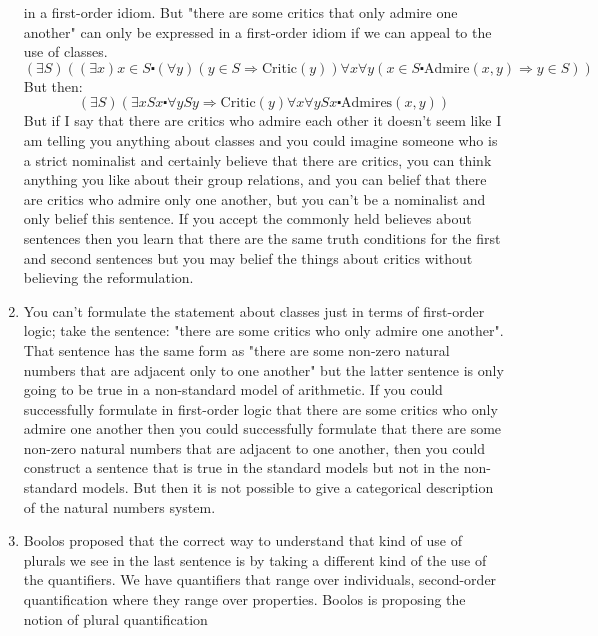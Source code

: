 \documentclass[12pt]{article}
\theoremstyle{definition}
\begin{document}
\begin{enumerate}
        in a first-order idiom. But "there are some critics that only admire
        one another" can only be expressed in a first-order idiom if we can
        appeal to the use of classes. 
        $$(\exists S)((\exists x) x \in S \centerdot (\forall y)(y \in S
        \Rightarrow \mathrm{Critic}(y)) \forall x \forall y(x \in S \centerdot
        \mathrm{Admire}(x, y) \Rightarrow y \in S))$$
        But then:
        $$(\exists S)(\exists x Sx \centerdot \forall y Sy \Rightarrow
        \mathrm{Critic}(y) \forall x \forall y S x \centerdot
        \mathrm{Admires}(x, y))$$
        But if I say that there are critics who admire each other it doesn't
        seem like I am telling you anything about classes and you could imagine
        someone who is a strict nominalist and certainly believe that there are
        critics, you can think anything you like about their group relations,
        and you can belief that there are critics who admire only one another,
        but you can't be a nominalist and only belief this sentence. If you
        accept the commonly held believes about sentences then you learn that
        there are the same truth conditions for the first and second sentences
        but you may belief the things about critics without believing the
        reformulation.
    \item
        You can't formulate the statement about classes just in terms of
        first-order logic; take the sentence: "there are some critics who only
        admire one another". That sentence has the same form as "there are some
        non-zero natural numbers that are adjacent only to one another" but the
        latter sentence is only going to be true in a non-standard model of
        arithmetic. If you could successfully formulate in first-order logic
        that there are some critics who only admire one another then you could
        successfully formulate that there are some non-zero natural numbers
        that are adjacent to one another, then you could construct a sentence
        that is true in the standard models but not in the non-standard models.
        But then it is not possible to give a categorical description of the
        natural numbers system.
    \item
        Boolos proposed that the correct way to understand that kind of use of
        plurals we see in the last sentence is by taking a different kind of
        the use of the quantifiers. We have quantifiers that range over
        individuals, second-order quantification where they range over
        properties. Boolos is proposing the notion of plural quantification

\end{enumerate}
\end{document}
